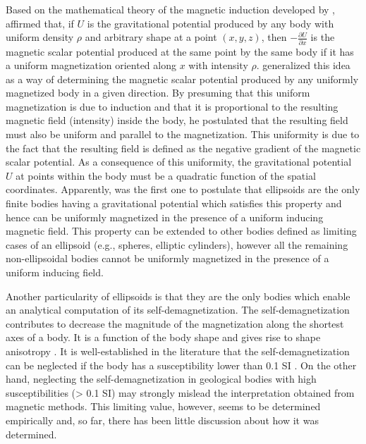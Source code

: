 \documentclass[gmd, manuscript]{copernicus}
\begin{document}
Based on the mathematical theory of the magnetic
induction developed by \citet{poisson1824},
\citet{maxwell1873} affirmed that, if $U$ is the
gravitational potential produced by any body
with uniform density $\rho$ and arbitrary shape at
a point $(x, y, z)$, then $-\frac{\partial U}{\partial x}$
is the magnetic scalar potential produced
at the same point by the same body
if it has a uniform magnetization oriented along $x$
with intensity $\rho$.
\citet{maxwell1873} generalized this idea as a way
of determining the magnetic scalar potential produced
by any uniformly magnetized body in a given direction.
By presuming that this uniform magnetization is due to
induction and that it is proportional to the resulting
magnetic field (intensity) inside the body, he postulated
that the resulting field must also be uniform and
parallel to the magnetization. This uniformity is due to
the fact that the resulting field is defined as the
negative gradient of the magnetic scalar potential.
As a consequence of this uniformity,
the gravitational potential $U$ at points within the
body must be a quadratic
function of the spatial coordinates.
Apparently, \citet{maxwell1873} was the first one to
postulate that ellipsoids are the only finite bodies
having a gravitational potential which satisfies this
property and hence can be uniformly magnetized
in the presence of a uniform inducing magnetic field.
This property can be extended to other bodies
defined as limiting cases of an ellipsoid
(e.g., spheres, elliptic cylinders), however all the
remaining non-ellipsoidal bodies cannot be
uniformly magnetized in the presence of a uniform
inducing field.

Another particularity of ellipsoids is that they are
the only bodies which enable an analytical computation
of its self-demagnetization.
The self-demagnetization contributes to decrease the
magnitude of the magnetization along the shortest
axes of a body.
It is a function of the body shape and gives rise
to shape anisotropy \citep{uyeda1963, thompson1986,
dunlop1997, clark1999, tauxe2003}.
It is well-established in the literature that
the self-demagnetization can be neglected if the
body has a susceptibility lower than 0.1 \unit{SI}
\citep{emerson1985, clark1986, eskola1980, guo1998,
guo2001, purss2005, hillan2013, austin2014, clark2014}.
On the other hand, neglecting the self-demagnetization in
geological bodies with high susceptibilities (> 0.1 \unit{SI})
may strongly mislead the interpretation obtained from
magnetic methods.
This limiting value, however, seems to be determined empirically
and, so far, there has been little discussion about
how it was determined.
\end{document}
